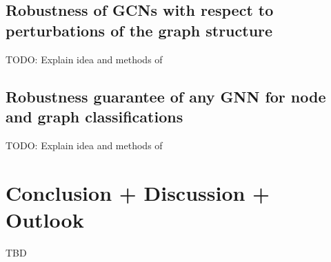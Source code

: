 \documentclass[a4paper,preprint]{sig-alternate}
\begin{document}
\vfill
\pagebreak

\subsection{Robustness of GCNs with respect to perturbations of the graph structure}
\label{sec:paper_three}

TODO: Explain idea and methods of \cite{10.1145/3394486.3403217}

\subsection{Robustness guarantee of any GNN for node and graph classifications}
\label{sec:paper_four}

TODO: Explain idea and methods of \cite{wang2020certified}

\section{Conclusion + Discussion + Outlook}
\label{sec:conclusion}
TBD

\vfill
\pagebreak



\end{document}
